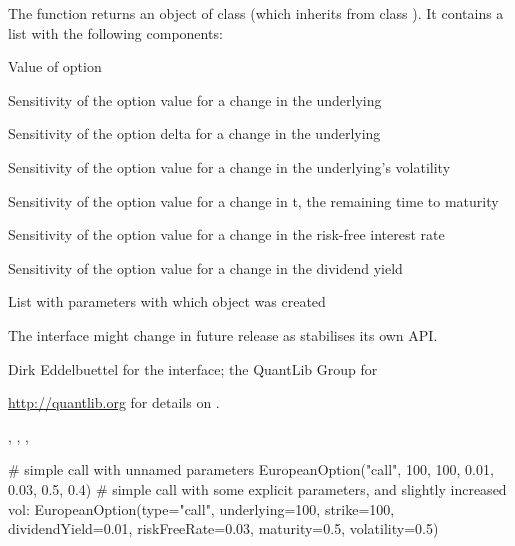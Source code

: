 \begin{Value}
The  function returns an object of class
 (which inherits from class 
). It contains a list with the following
components:
\begin{ldescription}
\item[\code{value}] Value of option
\item[\code{delta}] Sensitivity of the option value for a change in the underlying
\item[\code{gamma}] Sensitivity of the option delta for a change in the underlying
\item[\code{vega}] Sensitivity of the option value for a change in the
underlying's volatility
\item[\code{theta}] Sensitivity of the option value for a change in t, the
remaining time to maturity
\item[\code{rho}] Sensitivity of the option value for a change in the
risk-free interest rate
\item[\code{dividendRho}] Sensitivity of the option value for a change in the
dividend yield
\item[\code{parameters}] List with parameters with which object was created
\end{ldescription}
\end{Value}
\begin{Note}\relax
The interface might change in future release as 
stabilises its own API.
\end{Note}
\begin{Author}\relax
Dirk Eddelbuettel  for the \R{} interface;
the QuantLib Group for 
\end{Author}
\begin{References}\relax
\url{http://quantlib.org} for details on .
\end{References}
\begin{SeeAlso}\relax
{},
,
,
\end{SeeAlso}
\begin{Examples}
\begin{ExampleCode}
# simple call with unnamed parameters
EuropeanOption("call", 100, 100, 0.01, 0.03, 0.5, 0.4)
# simple call with some explicit parameters, and slightly increased vol:
EuropeanOption(type="call", underlying=100, strike=100, dividendYield=0.01, 
riskFreeRate=0.03, maturity=0.5, volatility=0.5)
\end{ExampleCode}
\end{Examples}

